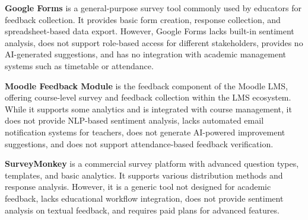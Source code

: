 \textbf{Google Forms} is a general-purpose survey tool commonly used by educators for feedback collection. It provides basic form creation, response collection, and spreadsheet-based data export. However, Google Forms lacks built-in sentiment analysis, does not support role-based access for different stakeholders, provides no AI-generated suggestions, and has no integration with academic management systems such as timetable or attendance.

\textbf{Moodle Feedback Module} is the feedback component of the Moodle LMS, offering course-level survey and feedback collection within the LMS ecosystem. While it supports some analytics and is integrated with course management, it does not provide NLP-based sentiment analysis, lacks automated email notification systems for teachers, does not generate AI-powered improvement suggestions, and does not support attendance-based feedback verification.

\textbf{SurveyMonkey} is a commercial survey platform with advanced question types, templates, and basic analytics. It supports various distribution methods and response analysis. However, it is a generic tool not designed for academic feedback, lacks educational workflow integration, does not provide sentiment analysis on textual feedback, and requires paid plans for advanced features.


